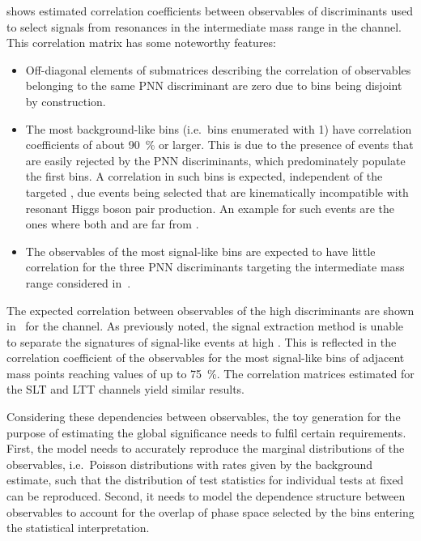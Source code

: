  shows estimated
correlation coefficients between observables of discriminants used to
select signals from resonances in the intermediate mass range in the
\hadhad channel. This correlation matrix has some noteworthy features:
\begin{itemize}
\item Off-diagonal elements of submatrices describing the correlation
  of observables belonging to the same PNN discriminant are zero due
  to bins being disjoint by construction.

\item The most background-like bins (i.e.\ bins enumerated with 1)
  have correlation coefficients of about \SI{90}{\percent} or
  larger. This is due to the presence of events that are easily
  rejected by the PNN discriminants, which predominately populate the
  first bins. A correlation in such bins is expected, independent of
  the targeted \mX, due events being selected that are kinematically
  incompatible with resonant Higgs boson pair production. An example
  for such events are the ones where both \mMMC and \mBB are far from
  \mH.

\item The observables of the most signal-like bins are expected to
  have little correlation for the three PNN discriminants targeting
  the intermediate mass range considered
  in~.
\end{itemize}

The expected correlation between observables of the high \mX
discriminants are shown
in~ for the \hadhad
channel. As previously noted, the signal extraction method is unable
to separate the signatures of signal-like events at high \mX. This is
reflected in the correlation coefficient of the observables for the
most signal-like bins of adjacent mass points reaching values of up to
\SI{75}{\percent}. The correlation matrices estimated for the \lephad
SLT and LTT channels yield similar results.

Considering these dependencies between observables, the toy generation
for the purpose of estimating the global significance needs to fulfil
certain requirements. First, the model needs to accurately reproduce
the marginal distributions of the observables, i.e.\ Poisson
distributions with rates given by the background estimate, such that
the distribution of test statistics for individual tests at fixed \mX
can be reproduced. Second, it needs to model the dependence structure
between observables to account for the overlap of phase space selected
by the bins entering the statistical interpretation.

